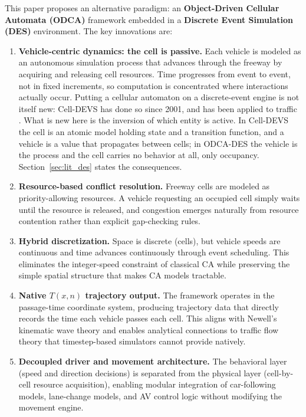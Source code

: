 \documentclass[review,authoryear]{elsarticle}
\begin{document}
This paper proposes an alternative paradigm: an \textbf{Object-Driven Cellular Automata (ODCA)} framework embedded in a \textbf{Discrete Event Simulation (DES)} environment. The key innovations are:

\begin{enumerate}
    \item \textbf{Vehicle-centric dynamics: the cell is passive.} Each vehicle is modeled as an autonomous simulation process that advances through the freeway by acquiring and releasing cell resources. Time progresses from event to event, not in fixed increments, so computation is concentrated where interactions actually occur. Putting a cellular automaton on a discrete-event engine is not itself new: Cell-DEVS \citep{wainer2001timed,wainer2014cellular} has done so since 2001, and has been applied to traffic \citep{davidson2000specifying,wainer2006atlas}. What is new here is the inversion of which entity is active. In Cell-DEVS the cell is an atomic model holding state and a transition function, and a vehicle is a value that propagates between cells; in ODCA-DES the vehicle is the process and the cell carries no behavior at all, only occupancy. Section~\ref{sec:lit_des} states the consequences.

    \item \textbf{Resource-based conflict resolution.} Freeway cells are modeled as priority-allowing resources. A vehicle requesting an occupied cell simply waits until the resource is released, and congestion emerges naturally from resource contention rather than explicit gap-checking rules.

    \item \textbf{Hybrid discretization.} Space is discrete (cells), but vehicle speeds are continuous and time advances continuously through event scheduling. This eliminates the integer-speed constraint of classical CA while preserving the simple spatial structure that makes CA models tractable.

    \item \textbf{Native $T(x,n)$ trajectory output.} The framework operates in the passage-time coordinate system, producing trajectory data that directly records the time each vehicle passes each cell. This aligns with Newell's kinematic wave theory \citep{newell1993simplified} and enables analytical connections to traffic flow theory that timestep-based simulators cannot provide natively.

    \item \textbf{Decoupled driver and movement architecture.} The behavioral layer (speed and direction decisions) is separated from the physical layer (cell-by-cell resource acquisition), enabling modular integration of car-following models, lane-change models, and AV control logic without modifying the movement engine.


\end{enumerate}
\end{document}
